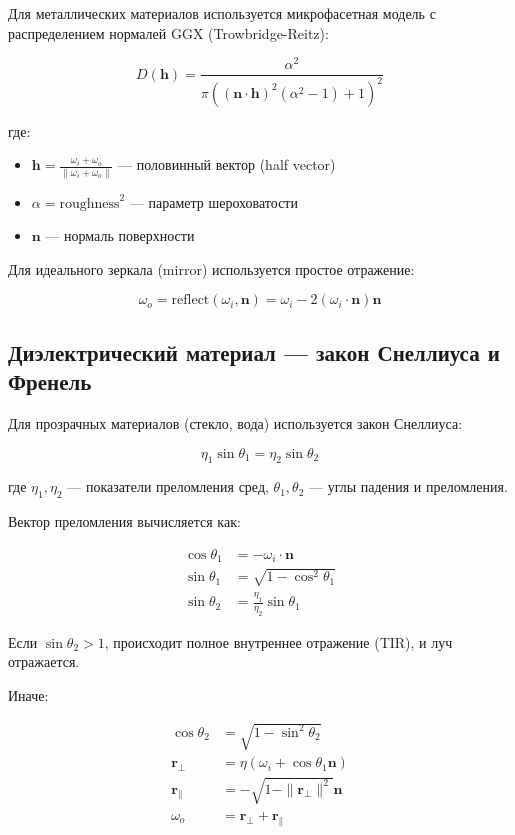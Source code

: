 \documentclass[14pt, a4paper]{extarticle}
\begin{document}
Для металлических материалов используется микрофасетная модель с распределением нормалей GGX (Trowbridge-Reitz):

\[
D(\mathbf{h}) = \frac{\alpha^2}{\pi((\mathbf{n} \cdot \mathbf{h})^2(\alpha^2 - 1) + 1)^2}
\]

где:
\begin{itemize}
    \item $\mathbf{h} = \frac{\omega_i + \omega_o}{\|\omega_i + \omega_o\|}$ --- половинный вектор (half vector)
    \item $\alpha = \text{roughness}^2$ --- параметр шероховатости
    \item $\mathbf{n}$ --- нормаль поверхности
\end{itemize}

Для идеального зеркала (mirror) используется простое отражение:

\[
\omega_o = \text{reflect}(\omega_i, \mathbf{n}) = \omega_i - 2(\omega_i \cdot \mathbf{n})\mathbf{n}
\]

\subsection{Диэлектрический материал --- закон Снеллиуса и Френель}

Для прозрачных материалов (стекло, вода) используется закон Снеллиуса:

\[
\eta_1 \sin\theta_1 = \eta_2 \sin\theta_2
\]

где $\eta_1, \eta_2$ --- показатели преломления сред, $\theta_1, \theta_2$ --- углы падения и преломления.

Вектор преломления вычисляется как:

\begin{align}
\cos\theta_1 &= -\omega_i \cdot \mathbf{n} \\
\sin\theta_1 &= \sqrt{1 - \cos^2\theta_1} \\
\sin\theta_2 &= \frac{\eta_1}{\eta_2} \sin\theta_1
\end{align}

Если $\sin\theta_2 > 1$, происходит полное внутреннее отражение (TIR), и луч отражается.

Иначе:

\begin{align}
\cos\theta_2 &= \sqrt{1 - \sin^2\theta_2} \\
\mathbf{r}_{\perp} &= \eta(\omega_i + \cos\theta_1 \mathbf{n}) \\
\mathbf{r}_{\parallel} &= -\sqrt{1 - \|\mathbf{r}_{\perp}\|^2} \mathbf{n} \\
\omega_o &= \mathbf{r}_{\perp} + \mathbf{r}_{\parallel}
\end{align}
\end{document}
